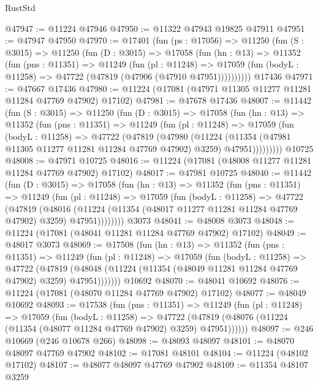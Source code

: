 \begin{lexlean}{RustStd}
\begin{coremodule}
@47947 := @11224 @47946
@47950 := @11322 @47943 @19825 @47911
@47951 := @47947 @47950
@47970 := @17401
    (fun (ps : @17056) =>
    @11250
      (fun (S : @3015) =>
      @11250
        (fun (D : @3015) =>
        @17058
          (fun (hn : @13) =>
          @11352
            (fun (pns : @11351) =>
            @11249
              (fun (pl : @11248) =>
              @17059 (fun (bodyL : @11258) => @47722 (@47819 (@47906 (@47910 @47951))))))))))
    @17436
@47971 := @47667 @17436
@47980 := @11224 (@17081 (@47971 @11305 @11277 @11281 @11284 @47769 @47902) @17102)
@47981 := @47678 @17436
@48007 := @11442
    (fun (S : @3015) =>
    @11250
      (fun (D : @3015) =>
      @17058
        (fun (hn : @13) =>
        @11352
          (fun (pns : @11351) =>
          @11249
            (fun (pl : @11248) =>
            @17059
              (fun (bodyL : @11258) =>
              @47722
                (@47819
                  (@47980
                    (@11224
                      (@11354 (@47981 @11305 @11277 @11281 @11284 @47769 @47902) @3259)
                      @47951)))))))))
    @10725
@48008 := @47971 @10725
@48016 := @11224 (@17081 (@48008 @11277 @11281 @11284 @47769 @47902) @17102)
@48017 := @47981 @10725
@48040 := @11442
    (fun (D : @3015) =>
    @17058
      (fun (hn : @13) =>
      @11352
        (fun (pns : @11351) =>
        @11249
          (fun (pl : @11248) =>
          @17059
            (fun (bodyL : @11258) =>
            @47722
              (@47819
                (@48016
                  (@11224 (@11354 (@48017 @11277 @11281 @11284 @47769 @47902) @3259) @47951))))))))
    @3073
@48041 := @48008 @3073
@48048 := @11224 (@17081 (@48041 @11281 @11284 @47769 @47902) @17102)
@48049 := @48017 @3073
@48069 := @17508
    (fun (hn : @13) =>
    @11352
      (fun (pns : @11351) =>
      @11249
        (fun (pl : @11248) =>
        @17059
          (fun (bodyL : @11258) =>
          @47722
            (@47819
              (@48048 (@11224 (@11354 (@48049 @11281 @11284 @47769 @47902) @3259) @47951)))))))
    @10692
@48070 := @48041 @10692
@48076 := @11224 (@17081 (@48070 @11284 @47769 @47902) @17102)
@48077 := @48049 @10692
@48093 := @17538
    (fun (pns : @11351) =>
    @11249
      (fun (pl : @11248) =>
      @17059
        (fun (bodyL : @11258) =>
        @47722 (@47819 (@48076 (@11224 (@11354 (@48077 @11284 @47769 @47902) @3259) @47951))))))
@48097 := @246 @10669 (@246 @10678 @266)
@48098 := @48093 @48097
@48101 := @48070 @48097 @47769 @47902
@48102 := @17081 @48101
@48104 := @11224 (@48102 @17102)
@48107 := @48077 @48097 @47769 @47902
@48109 := @11354 @48107 @3259

\end{coremodule}
\end{lexlean}
